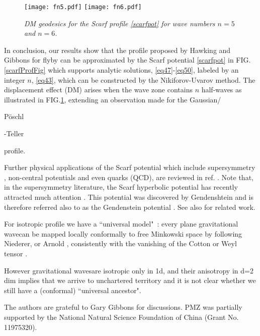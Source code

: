 \documentclass[preprint,showpacs,preprintnumbers,amsmath,amssymb,nofootinbib]{revtex4}
\newcommand{\PT}{{P\"oschl{\strut}-Teller\;}}
\newcommand{\GW}{{gravitational wave\,}}
\def\GW{{gravitational wave\;}}
\def\GWs{{gravitational waves\;}}
\begin{document}
\begin{figure}[h]
\texttt{[image: fn5.pdf]}\;
\texttt{[image: fn6.pdf]}
\vskip-3mm\caption{\textit{\small  DM geodesics for the Scarf profile \eqref{scarfpot} for wave numbers $n=5$ and $n=6$.
}
\label{n=5-6}
}
\end{figure}



In conclusion, our results show that the profile proposed by Hawking and Gibbons for flyby \cite{GibbHaw71} can be approximated by the Scarf potential \eqref{scarfpot} in FIG.\ref{scarfProfFig} which supports  analytic solutions, \eqref{eq47}-\eqref{eq50}, labeled by an integer $n$, \eqref{eq43}, which can be constructed by the Nikiforov-Uvarov method. The  displacement effect (DM) arises when the wave zone contains $n$ half-waves as illustrated in FIG.\ref{n=5-6}, extending an observation made  \cite{DM-2} for the Gaussian/\PT profile. 

Further physical applications of the  Scarf potential which include supersymmetry \cite{scarfpot,Compean}, non-central potentials \cite{Dutt} and even quarks (QCD), are reviewed in ref. \cite{Raposo}. Note that, in the supersymmetry literature, the Scarf hyperbolic potential has recently attracted much attention \cite{Scrf1}. This potential was discovered by Gendenshtein and is therefore referred also  to as the Gendenstein potential \cite{Gendenon,Natanson}. 
See also \cite{Hait,Bhattacharya23,Bhattacharya:2025ljc} for  related work. 

For  isotropic profile we have a ``universal model"~: every plane \GW  can  be mapped locally conformally to free Minkowski space by following  Niederer, or Arnold \cite{Niederer,Arnold,Takagi}, consistently with the vanishing of the Cotton or Weyl tensor \cite{Inomata,Dhasmana,GibbonsDark,ZZH21}.

However  \GWs are isotropic only in 1d, and their anisotropy in  d=2 dim implies that we arrive to unchartered territory \cite{Lukash,Inomata,ZZH21} and it is not clear whether we still have a (conformal) ``universal ancestor".
\goodbreak 

\begin{acknowledgments}\vskip-4mm
The authors are grateful to Gary Gibbons for discussions. PMZ was partially supported by the National Natural Science Foundation of China (Grant No. 11975320).
\end{acknowledgments}
\goodbreak
\end{document}
